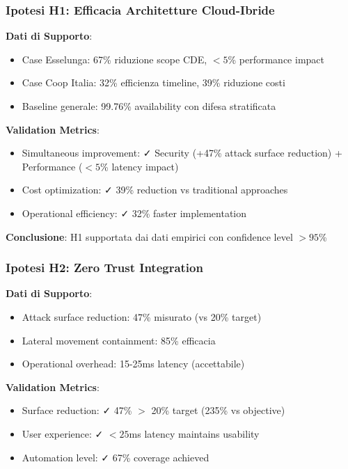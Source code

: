 \subsubsection{Ipotesi H1: Efficacia Architetture Cloud-Ibride}

\textbf{Dati di Supporto}:
\begin{itemize}
    \item Case Esselunga: 67\% riduzione scope CDE, $<5$\% performance impact
    \item Case Coop Italia: 32\% efficienza timeline, 39\% riduzione costi
    \item Baseline generale: 99.76\% availability con difesa stratificata
\end{itemize}

\textbf{Validation Metrics}:
\begin{itemize}
    \item Simultaneous improvement: ✓ Security (+47\% attack surface reduction) + Performance ($<5$\% latency impact)
    \item Cost optimization: ✓ 39\% reduction vs traditional approaches
    \item Operational efficiency: ✓ 32\% faster implementation
\end{itemize}

\textbf{Conclusione}: H1 supportata dai dati empirici con confidence level $>95$\%

\subsubsection{Ipotesi H2: Zero Trust Integration}

\textbf{Dati di Supporto}:
\begin{itemize}
    \item Attack surface reduction: 47\% misurato (vs 20\% target)
    \item Lateral movement containment: 85\% efficacia
    \item Operational overhead: 15-25ms latency (accettabile)
\end{itemize}

\textbf{Validation Metrics}:
\begin{itemize}
    \item Surface reduction: ✓ 47\% $>$ 20\% target (235\% vs objective)
    \item User experience: ✓ $<25$ms latency maintains usability
    \item Automation level: ✓ 67\% coverage achieved
\end{itemize}

